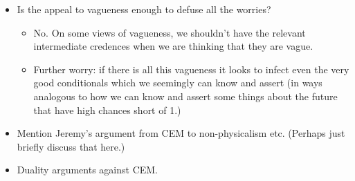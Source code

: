 \documentclass[If.tex]{subfiles}
\begin{document}



\begin{itemize}
	\item
	Is the appeal to vagueness enough to defuse all the worries?
	\begin{itemize}
		\item
		No. On some views of vagueness, we shouldn't have the relevant
		intermediate credences when we are thinking that they are vague.\\
		\item
		Further worry: if there is all this vagueness it looks to infect
		even the very good conditionals which we seemingly can know and
		assert (in ways analogous to how we can know and assert some
		things about the future that have high chances short of 1.)
	\end{itemize}
	\item
	Mention Jeremy's argument from CEM to non-physicalism etc. (Perhaps
	just briefly discuss that here.)
	\item
	Duality arguments against CEM.
\end{itemize}
\end{document}
